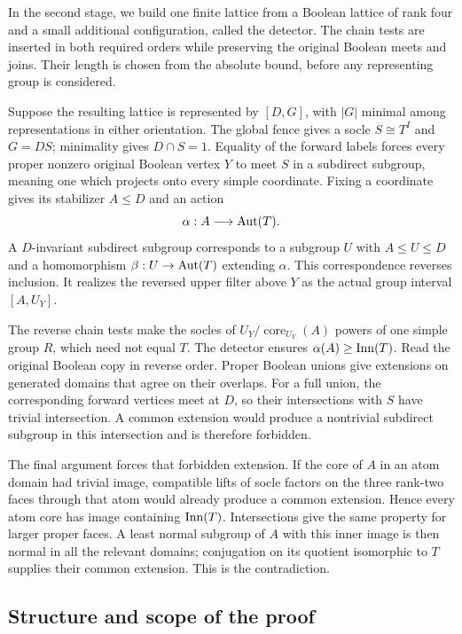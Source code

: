 In the second stage, we build one finite lattice from a Boolean lattice
of rank four and a small additional configuration, called the detector.
The chain tests are inserted in both required orders while preserving
the original Boolean meets and joins.  Their length is chosen from the
absolute bound, before any representing group is considered.

Suppose the resulting lattice is represented by $[D,G]$, with $|G|$
minimal among representations in either orientation.  The global fence
gives a socle $S\cong T^I$ and $G=DS$; minimality gives $D\cap S=1$.
Equality of the forward labels forces every proper nonzero original
Boolean vertex $Y$ to meet $S$ in a subdirect subgroup, meaning one
which projects onto every simple coordinate.  Fixing a coordinate
gives its stabilizer $A\le D$ and an action
\[
                   \alpha:A\longrightarrow\operatorname{Aut}(T).
\]
A $D$-invariant subdirect subgroup corresponds to a subgroup $U$ with
$A\le U\le D$ and a homomorphism $\beta:U\to\operatorname{Aut}(T)$ extending
$\alpha$.  This correspondence reverses inclusion.  It realizes the
reversed upper filter above $Y$ as the actual group interval $[A,U_Y]$.

The reverse chain tests make the socles of
$U_Y/\operatorname{core}_{U_Y}(A)$ powers of one simple group $R$,
which need not equal $T$.
The detector ensures $\alpha(A)\ge\operatorname{Inn}(T)$.  Read the original
Boolean copy in reverse order.  Proper Boolean unions give extensions
on generated domains that agree on their overlaps.  For a full union,
the corresponding forward vertices meet at $D$, so their intersections
with $S$ have trivial intersection.  A common extension would produce
a nontrivial subdirect subgroup in this intersection and is therefore
forbidden.

The final argument forces that forbidden extension.  If the core of
$A$ in an atom domain had trivial image, compatible lifts of socle
factors on the three rank-two faces through that atom would already
produce a common extension.  Hence every atom core has image containing
$\operatorname{Inn}(T)$.  Intersections give the same
property for larger proper faces.  A least normal subgroup of $A$
with this inner image is then normal in all the relevant domains;
conjugation on its quotient isomorphic to $T$ supplies their common
extension.  This is the contradiction.

\subsection{Structure and scope of the proof}

